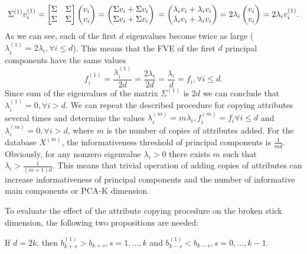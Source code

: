 \documentclass[entropy,article,submit,moreauthors,pdftex]{Definitions/mdpi}
\begin{document}
\begin{equation*}\label{eq.Eigen}
\Sigma ^{(1)}v^{(1)}_i= \begin{bmatrix}
\Sigma & \Sigma\\
\Sigma & \Sigma
\end{bmatrix}
\begin{pmatrix}
v_i \\
v_i
\end{pmatrix}
=
\begin{pmatrix}
\Sigma v_i + \Sigma v_i \\
\Sigma v_i + \Sigma v_i
\end{pmatrix}\\=
\begin{pmatrix}
\lambda_iv_i + \lambda_iv_i \\
\lambda_iv_i + \lambda_iv_i
\end{pmatrix}
=2\lambda_i
\begin{pmatrix}
v_i\\
v_i
\end{pmatrix}=
2\lambda_iv_i^{(1)}.
\end{equation*}
As we can see, each of the first $d$ eigenvalues become twice as large ($\lambda^{(1)}_i=2\lambda_i, \forall i\le d$). This means that the FVE of the first $d$ principal components have the same values
\begin{equation*}
f_i^{(1)}=\frac{\lambda^{(1)}_i}{2d}=\frac{2\lambda_i}{2d}=\frac{\lambda_i}{d}=f_i, \forall i\le d.
\end{equation*}
Since sum of the eigenvalues of the matrix $\Sigma ^{(1)}$ is $2d$ we can conclude that $\lambda^{(1)}_i=0, \forall i>d$. We can repeat the described procedure for copying attributes several times and determine the values $\lambda^{(m)}_i=m\lambda_i, f_i^{(m)}=f_i \forall i\le d$ and $\lambda^{(m)}_i=0, \forall i>d$, where $m$ is the number of copies of attributes added. For the database $X^{(m)}$, the informativeness threshold of principal components is $\frac{1}{md}$. Obviously, for any nonzero eigenvalue $\lambda_i>0$ there exists $m$ such that $\lambda_i>\frac{1}{(m+1)d}$. This means that trivial operation of adding copies of attributes can increase informativeness of principal components and the number of informative main components or PCA-K dimension.

To evaluate the effect of the attribute copying procedure on the broken stick dimension, the following two propositions are needed:
\begin{Proposition}\label{prop1}
If $d=2k$, then $b^{(1)}_{k+s}>b_{k+s}, s=1,\ldots,k$ and $b^{(1)}_{k-s}<b_{k-s}, s=0,\ldots, k-1$.
\end{Proposition}
\end{document}
